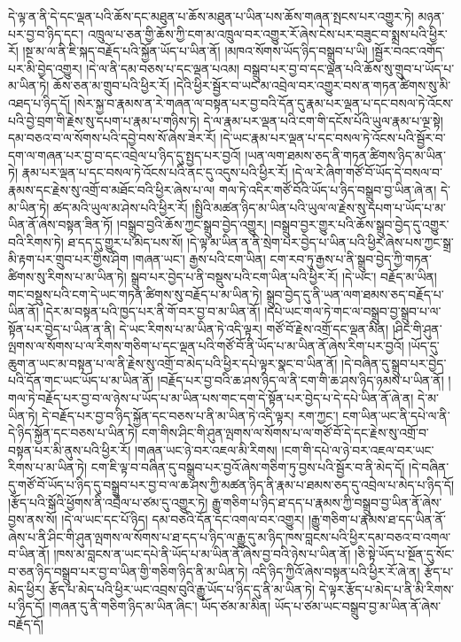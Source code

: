 དེ་ལྟ་ན་ནི་དེ་དང་ལྡན་པའི་ཆོས་དང་མཐུན་པ་ཆོས་མཐུན་པ་ཡིན་པས་ཆོས་གཞན་སྤངས་པར་འགྱུར་ཏེ། མཉན་པར་བྱ་བ་ཉིད་དང་། འཁྲུལ་པ་ཅན་གྱི་ཆོས་ཀྱི་ངག་མ་འཁྲུལ་བར་འགྱུར་རོ་ཞེས་ངེས་པར་བཟུང་བ་སྨྲས་པའི་ཕྱིར་རོ། །སྔ་མ་ལ་ནི་ཇི་སྐད་བརྗོད་པའི་སྐྱོན་ཡོད་པ་ཡིན་ནོ། །མཁའ་སོགས་ཡོད་ཉིད་བསྒྲུབ་པ་ཡི། །སྦྱོར་བའང་འགོད་པར་མི་བྱེད་འགྱུར། །དེ་ལ་ནི་དམ་བཅས་པ་དང་ལྡན་པའམ། བསྒྲུབ་པར་བྱ་བ་དང་ལྡན་པའི་ཆོས་སུ་གྲུབ་པ་ཡོད་པ་མ་ཡིན་ཏེ། ཆོས་ཅན་མ་གྲུབ་པའི་ཕྱིར་རོ། །དེའི་ཕྱིར་སྦྱོར་བ་ཡང་མ་འབྲེལ་བར་འགྱུར་བས་ན་གཏན་ཚིགས་སུ་མི་འཐད་པ་ཉིད་དོ། །སེར་སྐྱ་བ་རྣམས་ན་རེ་གཞན་ལ་བསྟན་པར་བྱ་བའི་དོན་དུ་རྣམ་པར་ལྡན་པ་དང་བསལ་ཏེ་འོངས་པའི་བྱེ་བྲག་གི་རྗེས་སུ་དཔག་པ་རྣམ་པ་གཉིས་ཏེ། དེ་ལ་རྣམ་པར་ལྡན་པའི་ངག་གི་དངོས་པོའི་ཡུལ་རྣམ་པ་ལྔ་སྟེ། དམ་བཅའ་བ་ལ་སོགས་པའི་དབྱེ་བས་སོ་ཞེས་ཟེར་རོ། །དེ་ཡང་རྣམ་པར་ལྡན་པ་དང་བསལ་ཏེ་འོངས་པའི་སྦྱོར་བ་དག་ལ་གཞན་པར་བྱ་བ་དང་འབྲེལ་པ་ཉིད་དུ་སྤྱད་པར་བྱའོ། །ཡན་ལག་ཐམས་ཅད་ནི་གཏན་ཚིགས་ཉིད་མ་ཡིན་ཏེ། རྣམ་པར་ལྡན་པ་དང་བསལ་ཏེ་འོངས་པའི་ནང་དུ་འདུས་པའི་ཕྱིར་རོ། །དེ་ལ་རེ་ཞིག་གཙོ་བོ་ཡོད་དེ་བསལ་བ་རྣམས་དང་རྗེས་སུ་འགྲོ་བ་མཐོང་བའི་ཕྱིར་ཞེས་པ་ལ། གལ་ཏེ་འདིར་གཙོ་བོའི་ཡོད་པ་ཉིད་བསྒྲུབ་བྱ་ཡིན་ཞེ་ན། དེ་མ་ཡིན་ཏེ། ཚད་མའི་ཡུལ་མ་ཤེས་པའི་ཕྱིར་རོ། །སྤྱིའི་མཚན་ཉིད་མ་ཡིན་པའི་ཡུལ་ལ་རྗེས་སུ་དཔག་པ་ཡོད་པ་མ་ཡིན་ནོ་ཞེས་བསྟན་ཟིན་ཏོ། །བསྒྲུབ་བྱའི་ཆོས་ཀྱང་སྒྲུབ་བྱེད་འགྱུར། །བསྒྲུབ་བྱར་གྱུར་པའི་ཆོས་སྒྲུབ་བྱེད་དུ་འགྱུར་བའི་རིགས་ཏེ། ཐ་དད་དུ་གྱུར་པ་མེད་པས་སོ། །དེ་ལྟ་མ་ཡིན་ན་ནི་སྲེག་པར་བྱེད་པ་ཡིན་པའི་ཕྱིར་ཞེས་པས་ཀྱང་སྒྲ་མི་རྟག་པར་གྲུབ་པར་གྱིས་ཤིག །གཞན་ཡང་། རྒྱས་པའི་ངག་ཡིན། ངག་རབ་ཏུ་རྒྱས་པ་ནི་སྒྲུབ་བྱེད་ཀྱི་གཏན་ཚིགས་སུ་རིགས་པ་མ་ཡིན་ཏེ། སྒྲུབ་པར་བྱེད་པ་ནི་བསྡུས་པའི་ངག་ཡིན་པའི་ཕྱིར་རོ། །དེ་ཡང་། བརྗོད་མ་ཡིན། གང་བསྡུས་པའི་ངག་དེ་ཡང་གཏན་ཚིགས་སུ་བརྗོད་པ་མ་ཡིན་ཏེ། སྒྲུབ་བྱེད་དུ་ནི་ཡན་ལག་ཐམས་ཅད་བརྗོད་པ་ཡིན་ནོ། །དེར་མ་བསྟན་པའི་ཁྱད་པར་ནི་གོ་བར་བྱ་བ་མ་ཡིན་ནོ། །དཔེ་ཡང་གལ་ཏེ་གང་ལ་བསྒྲུབ་བྱ་སྒྲུབ་པ་ལ་སྟོན་པར་བྱེད་པ་ཡིན་ན་ནི། དེ་ཡང་རིགས་པ་མ་ཡིན་ཏེ་འདི་ལྟར། གཙོ་བོ་རྗེས་འགྲོ་དང་ལྡན་མིན། །ཤིང་གི་ཤུན་ལྤགས་ལ་སོགས་པ་ལ་རིགས་གཅིག་པ་དང་ལྡན་པའི་གཙོ་བོ་ནི་ཡོད་པ་མ་ཡིན་ནོ་ཞེས་རིག་པར་བྱའོ། །ཡོད་དུ་ཆུག་ན་ཡང་མ་བསྟན་པ་ལ་ནི་རྗེས་སུ་འགྲོ་བ་མེད་པའི་ཕྱིར་དཔེ་ལྟར་སྣང་བ་ཡིན་ནོ། །དེ་བཞིན་དུ་སྒྲུབ་པར་བྱེད་པའི་དོན་གང་ཡང་ཡོད་པ་མ་ཡིན་ནོ། །བརྗོད་པར་བྱ་བའི་ཆ་ཤས་ཉིད་ལ་ནི་ངག་གི་ཆ་ཤས་ཉིད་ཉམས་པ་ཡིན་ནོ། །གལ་ཏེ་བརྗོད་པར་བྱ་བ་ལ་ཉེས་པ་ཡོད་པ་མ་ཡིན་པས་གང་དག་དེ་སྟོན་པར་བྱེད་པ་དེ་དཔེ་ཡིན་ནོ་ཞེ་ན། དེ་མ་ཡིན་ཏེ། དེ་བརྗོད་པར་བྱ་བ་ཉིད་སྐྱོན་དང་བཅས་པ་ནི་མ་ཡིན་ཏེ་འདི་ལྟར། རག་ཀྱང་། ངག་ཡིན་ཡང་ནི་དཔེ་ལ་ནི་དེ་ཉིད་སྐྱོན་དང་བཅས་པ་ཡིན་ཏེ། ངག་གིས་ཤིང་གི་ཤུན་ལྤགས་ལ་སོགས་པ་ལ་གཙོ་བོ་དེ་དང་རྗེས་སུ་འགྲོ་བ་བསྟན་པར་མི་ནུས་པའི་ཕྱིར་རོ། །གཞན་ཡང་ཉེ་བར་འཇལ་མི་རིགས། །ངག་གི་དཔེ་ལ་ཉེ་བར་འཇལ་བར་ཡང་རིགས་པ་མ་ཡིན་ཏེ། ངག་ཇི་ལྟ་བ་བཞིན་དུ་བསྒྲུབ་པར་བྱའོ་ཞེས་གཅིག་ཏུ་བྱས་པའི་སྦྱོར་བ་ནི་མེད་དོ། །དེ་བཞིན་དུ་གཙོ་བོ་ཡོད་པ་ཉིད་དུ་བསྒྲུབ་པར་བྱ་བ་ལ་ཆ་ཤས་ཀྱི་མཚན་ཉིད་ནི་རྣམ་པ་ཐམས་ཅད་དུ་འབྲེལ་པ་མེད་པ་ཉིད་དོ། །རྩོད་པའི་སྒོའི་ཕྱོགས་ནི་འབྲེལ་པ་ཙམ་དུ་འགྱུར་ཏེ། རྒྱུ་གཅིག་པ་ཉིད་ཐ་དད་པ་རྣམས་ཀྱི་བསྒྲུབ་བྱ་ཡིན་ནོ་ཞེས་བྱས་ནས་སོ། །དེ་ལ་ཡང་དང་པོ་ཉིད། དམ་བཅའི་དོན་དང་འགལ་བར་འགྱུར། །རྒྱུ་གཅིག་པ་རྣམས་ཐ་དད་ཡིན་ནོ་ཞེས་པ་ནི་ཤིང་གི་ཤུན་ལྤགས་ལ་སོགས་པ་ཐ་དད་པ་ཉིད་ལ་རྒྱུ་དུ་མ་ཉིད་ཁས་བླངས་པའི་ཕྱིར་དམ་བཅའ་བ་འགལ་བ་ཡིན་ནོ། །ཁས་མ་བླངས་ན་ཡང་དཔེ་ནི་ཡོད་པ་མ་ཡིན་ནོ་ཞེས་བྱ་བའི་ཉེས་པ་ཡིན་ནོ། །ཅི་སྟེ་ཡོད་པ་སྔོན་དུ་སོང་བ་ཅན་ཉིད་བསྒྲུབ་པར་བྱ་བ་ཡིན་གྱི་གཅིག་ཉིད་ནི་མ་ཡིན་ཏེ། འདི་ཉིད་ཀྱིའོ་ཞེས་བསྟན་པའི་ཕྱིར་རོ་ཞེ་ན། རྩོད་པ་མེད་ཕྱིར། རྩོད་པ་མེད་པའི་ཕྱིར་ཡང་འབྲས་བུའི་རྒྱུ་ཡོད་པ་ཉིད་དུ་ནི་མ་ཡིན་ཏེ། དེ་ལྟར་རྩོད་པ་མེད་པ་ནི་མི་རིགས་པ་ཉིད་དོ། །གཞན་དུ་ནི་གཅིག་ཉིད་མ་ཡིན་ཞིང་། ཡོད་ཙམ་མ་མིན། ཡོད་པ་ཙམ་ཡང་བསྒྲུབ་བྱ་མ་ཡིན་ནོ་ཞེས་བརྗོད་དོ། 